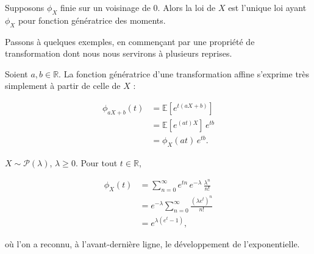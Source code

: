 \begin{mdframed}
\begin{theoreme}
Supposons $\phi_X$ finie sur un voisinage de $0$. Alors la loi de $X$ est l'unique loi ayant $\phi_X$ pour fonction génératrice des moments.
\end{theoreme}
\end{mdframed}

Passons à quelques exemples, en commençant par une propriété de transformation dont nous nous servirons à plusieurs reprises.

\begin{exemple}
Soient $a, b \in \mathbb{R}$. La fonction génératrice d'une transformation affine s'exprime très simplement à partir de celle de $X$ :

\begin{align*}
\phi_{aX+b}(t) &= \mathbb{E}[e^{t(aX+b)}] \\
&= \mathbb{E}[e^{(at)X}]\, e^{tb} \\
&= \phi_X(at)\, e^{tb}.
\end{align*}
\end{exemple}

\begin{exemple}
$X \sim \mathcal{P}(\lambda)$, $\lambda \geq 0$. Pour tout $t \in \mathbb{R}$,

\begin{align*}
\phi_X(t) &= \sum_{n=0}^\infty e^{tn}\, e^{-\lambda}\, \frac{\lambda^n}{n!} \\
&= e^{-\lambda} \sum_{n=0}^\infty \frac{(\lambda e^t)^n}{n!} \\
&= e^{\lambda(e^t - 1)},
\end{align*}

où l'on a reconnu, à l'avant-dernière ligne, le développement de l'exponentielle.
\end{exemple}

